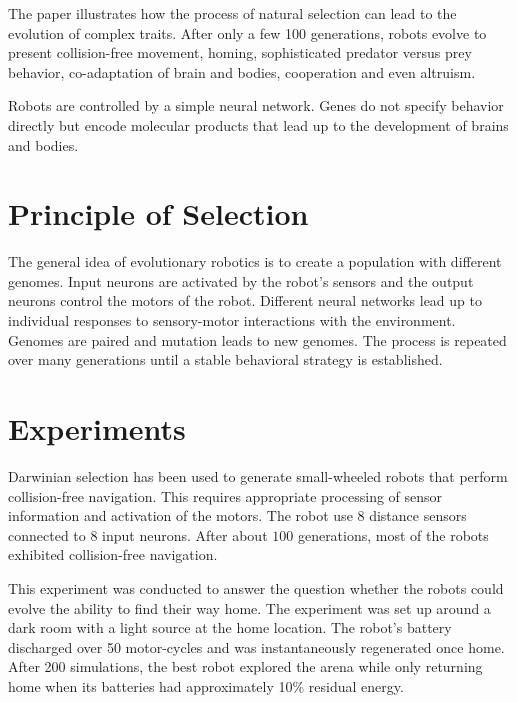 \documentclass[../main.tex]{subfiles}
\begin{document}
\begin{mdframed}
\end{mdframed}

The paper illustrates how the process of natural selection can lead to the evolution of complex traits. After only a
few 100 generations, robots evolve to present collision-free movement, homing, sophisticated predator versus prey
behavior, co-adaptation of brain and bodies, cooperation and even altruism.

Robots are controlled by a simple neural network. Genes do not specify behavior directly but encode molecular products
that lead up to the development of brains and bodies.

\section{Principle of Selection}

The general idea of evolutionary robotics is to create a population with different genomes. Input neurons are activated
by the robot's sensors and the output neurons control the motors of the robot. Different neural networks lead up to
individual responses to sensory-motor interactions with the environment. Genomes are paired and mutation leads to new
genomes. The process is repeated over many generations until a stable behavioral strategy is established.

\section{Experiments}

\begin{experiment}
Darwinian selection has been used to generate small-wheeled robots that perform collision-free navigation. This
requires appropriate processing of sensor information and activation of the motors. The robot use 8 distance sensors
connected to 8 input neurons. After about $100$ generations, most of the robots exhibited collision-free navigation.
\end{experiment}

\begin{experiment}
This experiment was conducted to answer the question whether the robots could evolve the ability to find their way
home. The experiment was set up around a dark room with a light source at the home location. The robot's battery
discharged over 50 motor-cycles and was instantaneously regenerated once home. After 200 simulations, the best robot
explored the arena while only returning home when its batteries had approximately 10\% residual energy.
\end{experiment}
\end{document}
